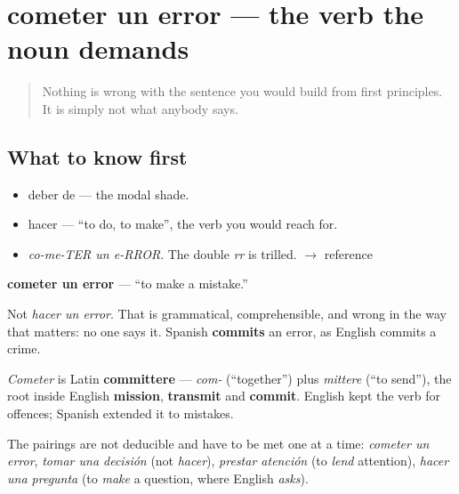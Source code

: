 \section[cometer un error]{cometer un error — the verb the noun demands}

\label{lesson:ES-C275-cometer-un-error}



\begin{quote}
Nothing is wrong with the sentence you would build from first principles. It is simply not what anybody says.
\end{quote}

\subsection*{What to know first}
\begin{itemize}
\raggedright
  \item deber de — the modal shade.
  \item hacer — \textquotedblleft{}to do, to make\textquotedblright{}, the verb you would reach for.
\end{itemize}

\begin{sounds}
\begin{itemize}
\raggedright
  \item \emph{co-me-TER un e-RROR}. The double \emph{rr} is trilled. $\to$ reference
\end{itemize}
\end{sounds}

\begin{cousinweb}
\textbf{cometer un error} — \textquotedblleft{}to make a mistake.\textquotedblright{}

Not \emph{hacer un error}. That is grammatical, comprehensible, and wrong in the way that matters: no one says it. Spanish \textbf{commits} an error, as English commits a crime.

\emph{Cometer} is Latin \textbf{committere} — \emph{com-} (\textquotedblleft{}together\textquotedblright{}) plus \emph{mittere} (\textquotedblleft{}to send\textquotedblright{}), the root inside English \textbf{mission}, \textbf{transmit} and \textbf{commit}. English kept the verb for offences; Spanish extended it to mistakes.

The pairings are not deducible and have to be met one at a time: \emph{cometer un error}, \emph{tomar una decisión} (not \emph{hacer}), \emph{prestar atención} (to \emph{lend} attention), \emph{hacer una pregunta} (to \emph{make} a question, where English \emph{asks}).
\end{cousinweb}

